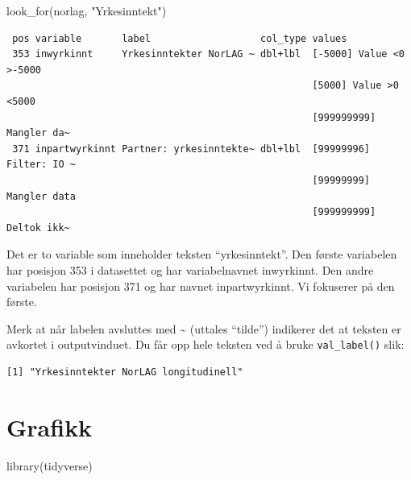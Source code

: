 \documentclass[
  letterpaper,
  DIV=11,
  numbers=noendperiod]{scrreprt}
\newenvironment{Shaded}{\begin{snugshade}}{\end{snugshade}}
\newcommand{\FunctionTok}[1]{\textcolor[rgb]{0.28,0.35,0.67}{#1}}
\newcommand{\NormalTok}[1]{\textcolor[rgb]{0.00,0.23,0.31}{#1}}
\newcommand{\SpecialCharTok}[1]{\textcolor[rgb]{0.37,0.37,0.37}{#1}}
\newcommand{\StringTok}[1]{\textcolor[rgb]{0.13,0.47,0.30}{#1}}
\begin{document}
\begin{Shaded}
\begin{Highlighting}[]
\FunctionTok{look\_for}\NormalTok{(norlag, }\StringTok{"Yrkesinntekt"}\NormalTok{)}
\end{Highlighting}
\end{Shaded}

\begin{verbatim}
 pos variable       label                   col_type values                 
 353 inwyrkinnt     Yrkesinntekter NorLAG ~ dbl+lbl  [-5000] Value <0 >-5000
                                                     [5000] Value >0 <5000  
                                                     [999999999] Mangler da~
 371 inpartwyrkinnt Partner: yrkesinntekte~ dbl+lbl  [99999996] Filter: IO ~
                                                     [99999999] Mangler data
                                                     [999999999] Deltok ikk~
\end{verbatim}

Det er to variable som inneholder teksten ``yrkesinntekt''. Den første
variabelen har posisjon 353 i datasettet og har variabelnavnet
inwyrkinnt. Den andre variabelen har posisjon 371 og har navnet
inpartwyrkinnt. Vi fokuserer på den første.

Merk at når labelen avsluttes med \textasciitilde{} (uttales ``tilde'')
indikerer det at teksten er avkortet i outputvinduet. Du får opp hele
teksten ved å bruke \texttt{val\_label()} slik:

\begin{Shaded}
\end{Shaded}

\begin{verbatim}
[1] "Yrkesinntekter NorLAG longitudinell"
\end{verbatim}


\hypertarget{grafikk}{%
\chapter{Grafikk}\label{grafikk}}

\begin{Shaded}
\begin{Highlighting}[]
\FunctionTok{library}\NormalTok{(tidyverse)}
\end{Highlighting}
\end{Shaded}
\end{document}
